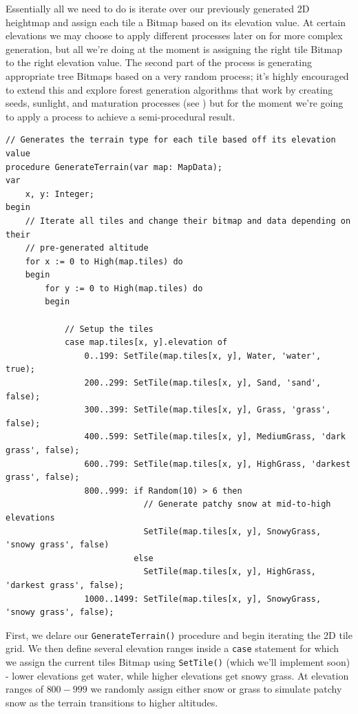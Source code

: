 \documentclass{article}
\begin{document}
Essentially all we need to do is iterate over our previously generated 2D heightmap and assign each tile a Bitmap based on its elevation value. At certain elevations we may choose to apply different processes later on for more complex generation, but all we're doing at the moment is assigning the right tile Bitmap to the right elevation value. The second part of the process is generating appropriate tree Bitmaps based on a very random process; it's highly encouraged to extend this and explore \label{forestalgo}forest generation algorithms that work by creating seeds, sunlight, and maturation processes (see \cite{forests}) but for the moment we're going to apply a process to achieve a semi-procedural result.

\begin{verbatim}
// Generates the terrain type for each tile based off its elevation value
procedure GenerateTerrain(var map: MapData);
var
	x, y: Integer;
begin
	// Iterate all tiles and change their bitmap and data depending on their
	// pre-generated altitude
	for x := 0 to High(map.tiles) do
	begin
		for y := 0 to High(map.tiles) do
		begin

			// Setup the tiles
			case map.tiles[x, y].elevation of
				0..199: SetTile(map.tiles[x, y], Water, 'water', true);
				200..299: SetTile(map.tiles[x, y], Sand, 'sand', false);
				300..399: SetTile(map.tiles[x, y], Grass, 'grass', false);
				400..599: SetTile(map.tiles[x, y], MediumGrass, 'dark grass', false);
				600..799: SetTile(map.tiles[x, y], HighGrass, 'darkest grass', false);
				800..999: if Random(10) > 6 then
							// Generate patchy snow at mid-to-high elevations
							SetTile(map.tiles[x, y], SnowyGrass, 'snowy grass', false)
						  else
							SetTile(map.tiles[x, y], HighGrass, 'darkest grass', false);
				1000..1499: SetTile(map.tiles[x, y], SnowyGrass, 'snowy grass', false);
\end{verbatim}

First, we delare our \texttt{GenerateTerrain()} procedure and begin iterating the 2D tile grid. We then define several elevation ranges inside a \texttt{case} statement for which we assign the current tiles Bitmap using \texttt{SetTile()} (which we'll implement soon) - lower elevations get water, while higher elevations get snowy grass. At elevation ranges of $800-999$ we randomly assign either snow or grass to simulate patchy snow as the terrain transitions to higher altitudes.
\end{document}
